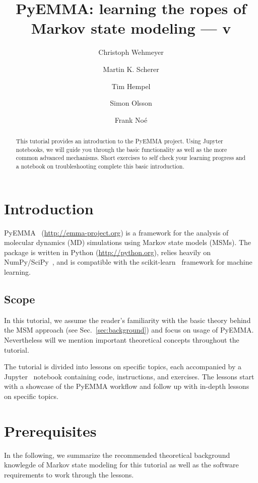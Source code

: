 \documentclass[9pt,tutorial]{livecoms}
\title{PyEMMA: learning the ropes of Markov state modeling --- v\versionnumber}
\author[1\authfn{1}*]{Christoph Wehmeyer}
\author[1\authfn{1}*]{Martin K. Scherer}
\author[1\authfn{1}*]{Tim Hempel}
\author[1*]{Simon Olsson}
\author[1*]{Frank Noé}
\affil[1]{Department of Mathematics and Computer Science, Freie Universität Berlin, Arnimallee 6, 14195 Berlin, Germany}
\begin{document}
\begin{frontmatter}
\maketitle

\begin{abstract}
This tutorial provides an introduction to the PyEMMA project. Using Jupyter notebooks, we will guide you through the basic functionality as well as the more common advanced mechanisms. Short exercises to self check your learning progress and a notebook on troubleshooting complete this basic introduction.
\end{abstract}

\end{frontmatter}

\section{Introduction}

PyEMMA~\cite{pyemma} (\url{http://emma-project.org}) is a framework for the analysis of molecular dynamics (MD) simulations using Markov state models\cite{schuette-msm,singhal-msm-naming} (MSMs). The package is written in Python (\url{http://python.org}), relies heavily on NumPy/SciPy~\cite{numpy,scipy}, and is compatible with the scikit-learn~\cite{sklearn} framework for machine learning.

\subsection{Scope}

In this tutorial, we assume the reader's familiarity with the basic theory behind the MSM approach (see Sec.~\ref{sec:background}) and focus on usage of PyEMMA. Nevertheless will we mention important theoretical concepts throughout the tutorial.

The tutorial is divided into lessons on specific topics, each accompanied by a Jupyter~\cite{jupyter} notebook containing code, instructions, and exercises. The lessons start with a showcase of the PyEMMA workflow and follow up with in-depth lessons on specific topics.

\section{Prerequisites}

In the following, we summarize the recommended theoretical background knowlegde of Markov state modeling for this tutorial as well as the software requirements to work through the lessons.
\end{document}
